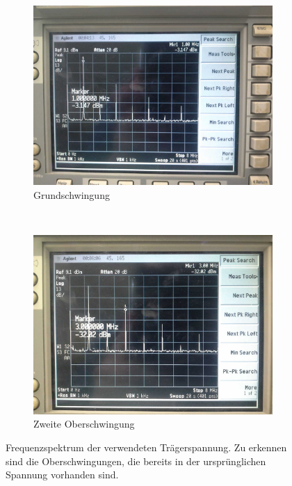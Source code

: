 \FloatBarrier
\begin{figure}[!h]
\begin{subfigure}[t]{0.5\textwidth}
	\centering
	\includegraphics[scale=0.17]{../Grafiken/TraegerspannungOberwellen_0.jpg}
	\caption{Grundschwingung \label{fig:traegerspannungoberwellen_0}}
\end{subfigure}%
~
\begin{subfigure}[t]{0.5\textwidth}
	\centering
	\includegraphics[scale=0.17]{../Grafiken/TraegerspannungOberwellen_2.jpg}
	\caption{Zweite Oberschwingung\label{fig:traegerspannungoberwellen_2}}
\end{subfigure}
	\caption{Frequenzspektrum der verwendeten Trägerspannung. Zu erkennen sind die Oberschwingungen,
		     die bereits in der ursprünglichen Spannung vorhanden sind. \label{fig:traegerspannungoberwellen}}
\end{figure}
\FloatBarrier